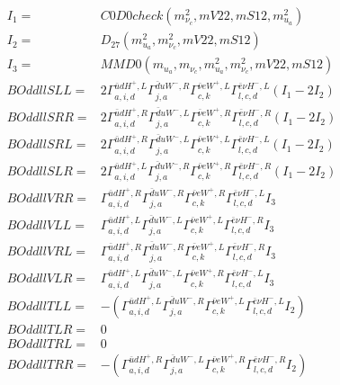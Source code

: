 \documentclass[A4,landscape]{article}
\begin{document}
\begin{align} 
I_1 = & C0D0check(m^2_{\nu_{{c}}}, mV22, mS12, m^2_{u_{{a}}}) \\ 
I_2 = & D_{27}(m^2_{u_{{a}}}, m^2_{\nu_{{c}}}, mV22, mS12) \\ 
I_3 = & MMD0(m_{u_{{a}}}, m_{\nu_{{c}}}, m^2_{u_{{a}}}, m^2_{\nu_{{c}}}, mV22, mS12) \\ 
  BOddllSLL= & 2  \Gamma^{\bar{u}d H^+,L}_{a, i, d} \Gamma^{\bar{d}u W^- ,R}_{j, a} \Gamma^{\bar{\nu}e W^+,L}_{c, k} \Gamma^{\bar{e}\nu H^- ,L}_{l, c, d} (I_1 - 2 I_2) \\ 
  BOddllSRR= & 2  \Gamma^{\bar{u}d H^+,R}_{a, i, d} \Gamma^{\bar{d}u W^- ,L}_{j, a} \Gamma^{\bar{\nu}e W^+,R}_{c, k} \Gamma^{\bar{e}\nu H^- ,R}_{l, c, d} (I_1 - 2 I_2) \\ 
  BOddllSRL= & 2  \Gamma^{\bar{u}d H^+,R}_{a, i, d} \Gamma^{\bar{d}u W^- ,L}_{j, a} \Gamma^{\bar{\nu}e W^+,L}_{c, k} \Gamma^{\bar{e}\nu H^- ,L}_{l, c, d} (I_1 - 2 I_2) \\ 
  BOddllSLR= & 2  \Gamma^{\bar{u}d H^+,L}_{a, i, d} \Gamma^{\bar{d}u W^- ,R}_{j, a} \Gamma^{\bar{\nu}e W^+,R}_{c, k} \Gamma^{\bar{e}\nu H^- ,R}_{l, c, d} (I_1 - 2 I_2) \\ 
  BOddllVRR= &  \Gamma^{\bar{u}d H^+,R}_{a, i, d} \Gamma^{\bar{d}u W^- ,R}_{j, a} \Gamma^{\bar{\nu}e W^+,R}_{c, k} \Gamma^{\bar{e}\nu H^- ,L}_{l, c, d} I_3 \\ 
  BOddllVLL= &  \Gamma^{\bar{u}d H^+,L}_{a, i, d} \Gamma^{\bar{d}u W^- ,L}_{j, a} \Gamma^{\bar{\nu}e W^+,L}_{c, k} \Gamma^{\bar{e}\nu H^- ,R}_{l, c, d} I_3 \\ 
  BOddllVRL= &  \Gamma^{\bar{u}d H^+,R}_{a, i, d} \Gamma^{\bar{d}u W^- ,R}_{j, a} \Gamma^{\bar{\nu}e W^+,L}_{c, k} \Gamma^{\bar{e}\nu H^- ,R}_{l, c, d} I_3 \\ 
  BOddllVLR= &  \Gamma^{\bar{u}d H^+,L}_{a, i, d} \Gamma^{\bar{d}u W^- ,L}_{j, a} \Gamma^{\bar{\nu}e W^+,R}_{c, k} \Gamma^{\bar{e}\nu H^- ,L}_{l, c, d} I_3 \\ 
  BOddllTLL= & -( \Gamma^{\bar{u}d H^+,L}_{a, i, d} \Gamma^{\bar{d}u W^- ,R}_{j, a} \Gamma^{\bar{\nu}e W^+,L}_{c, k} \Gamma^{\bar{e}\nu H^- ,L}_{l, c, d} I_2) \\ 
  BOddllTLR= & 0 \\ 
  BOddllTRL= & 0 \\ 
  BOddllTRR= & -( \Gamma^{\bar{u}d H^+,R}_{a, i, d} \Gamma^{\bar{d}u W^- ,L}_{j, a} \Gamma^{\bar{\nu}e W^+,R}_{c, k} \Gamma^{\bar{e}\nu H^- ,R}_{l, c, d} I_2) \\ 
\end{align} 
\end{document}
